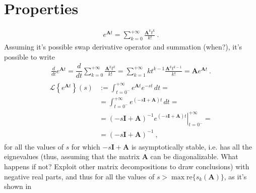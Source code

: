 \documentclass[letterpaper,10pt,english]{jupyterBook}
\begin{document}
\section{Properties}
\label{\detokenize{ch/ode/lti:properties}}\label{\detokenize{ch/ode/lti:ode-lti-matrix-properties}}
\sphinxAtStartPar
{}
\begin{equation*}
\begin{split}e^{\mathbf{A} t} = \sum_{k = 0}^{+\infty} \frac{\mathbf{A}^k t^k}{k!} \ .\end{split}
\end{equation*}
\sphinxAtStartPar
Assuming it’s possible swap derivative operator and summation (when?), it’s possible to write
\begin{equation*}
\begin{split}\frac{d}{dt} e^{\mathbf{A}t} = \dfrac{d}{dt} \sum_{k = 0}^{+\infty} \frac{\mathbf{A}^k t^k}{k!} = \sum_{k=1}^{+\infty} k t^{k-1} \frac{\mathbf{A}^k t^{k-1}}{k!} = \mathbf{A} e^{\mathbf{A} t} \ .\end{split}
\end{equation*}
\sphinxAtStartPar
{}
\begin{equation*}
\begin{split}\begin{aligned}
  \mathscr{L}\left\{ e^{\mathbf{A}t} \right\}(s)
  & := \int_{t=0^-}^{+\infty} e^{\mathbf{A} t} e^{-s t} \, dt = \\
  & = \int_{t=0^-}^{+\infty} e^{(-s\mathbf{I} + \mathbf{A}) t} \, dt = \\
  & = (-s\mathbf{I} + \mathbf{A})^{-1} \left.e^{(-s\mathbf{I} + \mathbf{A}) t}\right|_{t=0^-}^{+\infty} = \\
  & = (- s \mathbf{I} + \mathbf{A})^{-1} \ ,
\end{aligned}\end{split}
\end{equation*}
\sphinxAtStartPar
for all the values of \(s\) for which \(-s\mathbf{I} + \mathbf{A}\) is asymptotically stable, i.e. has all the eignevalues (thus, assuming that the matrix \(\mathbf{A}\) can be diagonalizable. What happens if not? Exploit other matrix decompositions to draw conclusions) with negative real parts, and thus for all the values of \(s > \max \text{re}\{ s_k(\mathbf{A}) \}\), as it’s shown in {\hyperref[\detokenize{ch/ode/lti:matrix-stability-spectrum}]{}}
\label{ch/ode/lti:matrix-stability-spectrum}
\end{document}
